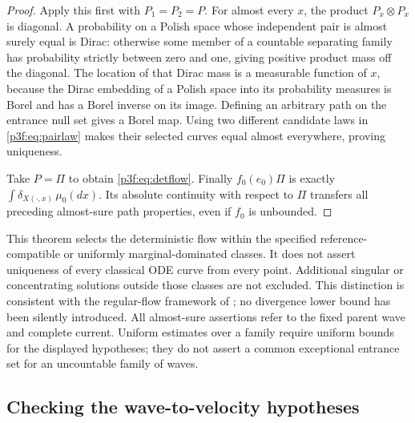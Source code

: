 \documentclass[11pt]{article}
\numberwithin{equation}{section}
\theoremstyle{definition}
\theoremstyle{remark}
\begin{document}
\begin{proof}
Apply this first with $P_1=P_2=P$. For almost every $x$, the product
$P_x\otimes P_x$ is diagonal. A probability on a Polish space whose
independent pair is almost surely equal is Dirac: otherwise some
member of a countable separating family has probability strictly
between zero and one, giving positive product mass off the diagonal.
The location of that Dirac mass is a measurable function of $x$,
because the Dirac embedding of a Polish space into its probability
measures is Borel and has a Borel inverse on its image. Defining an
arbitrary path on the entrance null set gives a Borel map.
Using two different candidate laws in \eqref{p3f:eq:pairlaw} makes
their selected curves equal almost everywhere, proving uniqueness.

Take $P=\Pi$ to obtain \eqref{p3f:eq:detflow}. Finally
$f_0(e_0)\Pi$ is exactly
$\int\delta_{X(\cdot,x)}\,\mu_0(dx)$. Its absolute continuity with
respect to $\Pi$ transfers all preceding almost-sure path properties,
even if $f_0$ is unbounded.
\end{proof}

This theorem selects the deterministic flow within the specified
reference-compatible or uniformly marginal-dominated classes.
It does not assert uniqueness of every classical ODE curve from
every point. Additional singular or concentrating solutions outside
those classes are not excluded. This distinction is consistent with
the regular-flow framework of \cite{ACFmaximal}; no divergence
lower bound has been silently introduced.
All almost-sure assertions refer to the fixed parent wave and complete
current. Uniform estimates over a family require uniform bounds for
the displayed hypotheses; they do not assert a common exceptional
entrance set for an uncountable family of waves.

\subsection{Checking the wave-to-velocity hypotheses}
\end{document}
